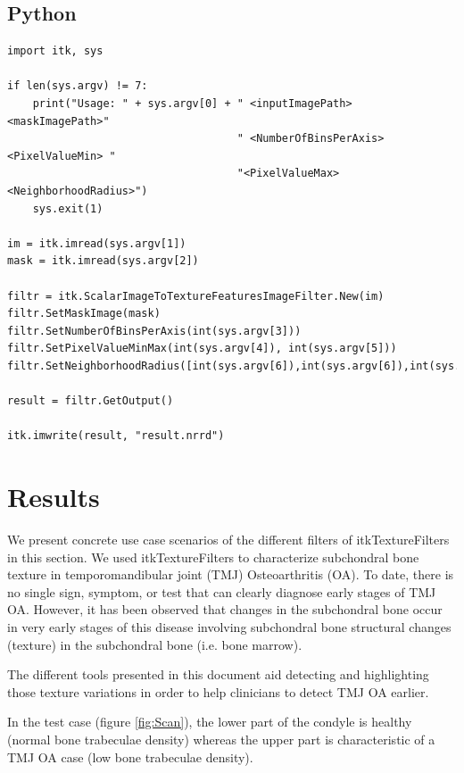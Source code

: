 \documentclass{InsightArticle}
\begin{document}
\subsection{Python}
\label{sec:pythonEx}

\begin{verbatim}
import itk, sys

if len(sys.argv) != 7:
    print("Usage: " + sys.argv[0] + " <inputImagePath> <maskImagePath>"
                                    " <NumberOfBinsPerAxis> <PixelValueMin> "
                                    "<PixelValueMax> <NeighborhoodRadius>")
    sys.exit(1)

im = itk.imread(sys.argv[1])
mask = itk.imread(sys.argv[2])

filtr = itk.ScalarImageToTextureFeaturesImageFilter.New(im)
filtr.SetMaskImage(mask)
filtr.SetNumberOfBinsPerAxis(int(sys.argv[3]))
filtr.SetPixelValueMinMax(int(sys.argv[4]), int(sys.argv[5]))
filtr.SetNeighborhoodRadius([int(sys.argv[6]),int(sys.argv[6]),int(sys.argv[6])])

result = filtr.GetOutput()

itk.imwrite(result, "result.nrrd")
\end{verbatim}
\normalsize
\newpage
\section{Results}
\label{sec:results}

We present concrete use case scenarios of the different filters of itkTextureFilters in this section. We used itkTextureFilters to characterize subchondral bone texture in temporomandibular joint (TMJ) Osteoarthritis (OA). To date, there is no single sign, symptom, or test that can clearly diagnose early stages of TMJ OA. However, it has been observed that changes in the subchondral bone occur in very early stages of this disease involving subchondral bone structural changes (texture) in the subchondral bone (i.e. bone marrow). 

The different tools presented in this document aid detecting and highlighting those texture variations in order to help clinicians to detect  TMJ OA earlier.

In the test case (figure \ref{fig:Scan}), the lower part of the condyle is healthy (normal bone trabeculae density) whereas the upper part is characteristic of a TMJ OA case (low bone trabeculae density).
\end{document}
